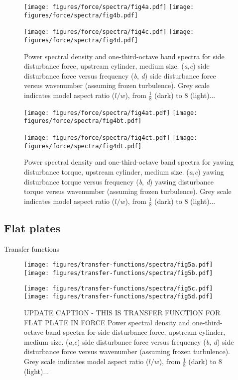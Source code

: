 \documentclass{jfm}
\begin{document}
\begin{figure} 
\centerline{\texttt{[image: figures/force/spectra/fig4a.pdf]}%
\texttt{[image: figures/force/spectra/fig4b.pdf]}}
\centerline{\texttt{[image: figures/force/spectra/fig4c.pdf]}%
\texttt{[image: figures/force/spectra/fig4d.pdf]}}
\caption{Power spectral density and one-third-octave band spectra for side disturbance force, upstream cylinder, medium size. (\textit{a},\textit{c}) side disturbance force versus frequency (\textit{b}, \textit{d}) side disturbance force versus wavenumber (assuming frozen turbulence).  Grey scale indicates model aspect ratio ($l/w$), from $\frac{1}{8}$ (dark) to \num{8} (light)...}
\label{fig:exampleforcespectra}
\end{figure}

\begin{figure} 
\centerline{\texttt{[image: figures/force/spectra/fig4at.pdf]}%
\texttt{[image: figures/force/spectra/fig4bt.pdf]}}
\centerline{\texttt{[image: figures/force/spectra/fig4ct.pdf]}%
\texttt{[image: figures/force/spectra/fig4dt.pdf]}}
\caption{Power spectral density and one-third-octave band spectra for yawing disturbance torque, upstream cylinder, medium size. (\textit{a},\textit{c}) yawing disturbance torque versus frequency (\textit{b}, \textit{d}) yawing disturbance torque versus wavenumber (assuming frozen turbulence).  Grey scale indicates model aspect ratio ($l/w$), from $\frac{1}{8}$ (dark) to \num{8} (light)...}
\label{fig:exampleforcespectra}
\end{figure}



\subsection{Flat plates}
Transfer functions

\begin{figure} 
\centerline{\texttt{[image: figures/transfer-functions/spectra/fig5a.pdf]}%
\texttt{[image: figures/transfer-functions/spectra/fig5b.pdf]}}
\centerline{\texttt{[image: figures/transfer-functions/spectra/fig5c.pdf]}%
\texttt{[image: figures/transfer-functions/spectra/fig5d.pdf]}}
\caption{UPDATE CAPTION - THIS IS TRANSFER FUNCTION FOR FLAT PLATE IN FORCE Power spectral density and one-third-octave band spectra for side disturbance force, upstream cylinder, medium size. (\textit{a},\textit{c}) side disturbance force versus frequency (\textit{b}, \textit{d}) side disturbance force versus wavenumber (assuming frozen turbulence).  Grey scale indicates model aspect ratio ($l/w$), from $\frac{1}{8}$ (dark) to \num{8} (light)...}
\end{figure}
\end{document}
